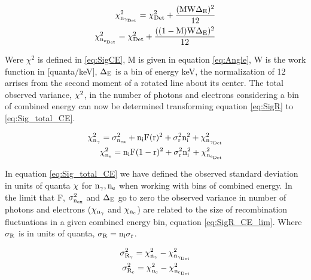 \begin{equation}
\begin{split}
\rm \chi_{n_{\gamma_{Det}}}^2= \chi_{Det}^2 + \frac{(MW\Delta_E)^2}{12}\\
\rm \chi_{n_{e_{Det}}}^2= \chi_{Det}^2 + \frac{((1-M)W\Delta_E)^2}{12}\\
\label{eq:SigCE_2}
\end{split}
\end{equation}



Were $\chi^2$ is defined in \ref{eq:SigCE}, M is given in equation \ref{eq:Angle}, W is the work function in [quanta/keV], $\rm \Delta_E$ is a bin of energy keV, the normalization of 12 arrises from the second moment of a rotated line about its center. The total observed variance, $\rm \chi^2$, in the number of photons and electrons considering a bin of combined energy can now be determined transforming equation \ref{eq:SigR} to \ref{eq:Sig_total_CE}.

 
\begin{equation}
\begin{split}
\rm \chi_{n_\gamma}^2 = \sigma_{n_{ex}}^2 + n_iF(r)^2 + \sigma_{r}^2 n_i^2 + \chi_{n_{\gamma_{Det}}}^2 \\
\rm \chi_{n_e}^2  = n_iF(1-r)^2 + \sigma_{r}^2 n_i^2 + \chi_{n_{e_{Det}}}^2
\label{eq:Sig_total_CE}
\end{split}
\end{equation}


In equation \ref{eq:Sig_total_CE} we have defined the observed standard deviation in units of quanta $\rm \chi$ for $\rm n_\gamma, n_e$ when working with bins of combined energy. In the limit that F, $\rm \sigma_{n_{ex}}^2$ and $\rm \Delta_E$ go to zero the observed variance in number of photons and electrons ($\rm \chi_{n_\gamma}$ and $\rm \chi_{n_e}$) are related to the size of recombination fluctuations in a given combined energy bin, equation \ref{eq:SigR_CE_lim}. Where $\rm \sigma_R$ is in units of quanta, $\rm \sigma_R = n_i\sigma_r$.

\begin{equation}
\begin{split}
\rm \sigma_{R_\gamma}^2 = \chi_{n_\gamma}^2 - \chi_{n_{\gamma_{Det}}}^2  \\
\rm \sigma_{R_e}^2 = \chi_{n_e}^2 - \chi_{n_{e_{Det}}}^2
\label{eq:SigR_CE_lim}
\end{split}
\end{equation}

